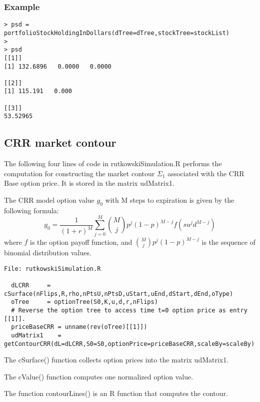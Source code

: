 \documentclass[10pt]{article}
\begin{document}
\subsubsection*{Example}

\begin{verbatim}
> psd = portfolioStockHoldingInDollars(dTree=dTree,stockTree=stockList)
>
> psd
[[1]]
[1] 132.6896   0.0000   0.0000

[[2]]
[1] 115.191   0.000

[[3]]
53.52965

\end{verbatim}


\subsection*{CRR market contour}

The following four lines of code in rutkowskiSimulation.R performs the
computation for constructing the market contour $\Sigma_1$ associated with the
CRR Base option price. It is stored in the matrix udMatrix1.

The CRR model option value $g_0$  with M steps to expiration is given by the following formula:
\[
g_0 = \frac{1}{(1+r)^M} \sum_{j=0}^M \binom{M}{j} p^j (1-p)^{M-j} f(s u^j d^{M-j})
\]
where $f$ is the option payoff function, and $\binom{M}{j} p^j (1-p)^{M-j}$ is the
sequence of binomial distribution values.

\begin{verbatim}
File: rutkowskiSimulation.R

  dLCRR     = cSurface(nFlips,R,rho,nPtsU,nPtsD,uStart,uEnd,dStart,dEnd,oType)
  oTree     = optionTree(S0,K,u,d,r,nFlips)
  # Reverse the option tree to access time t=0 option price as entry [[1]].
  priceBaseCRR = unname(rev(oTree)[[1]])
  udMatrix1    = getContourCRR(dL=dLCRR,S0=S0,optionPrice=priceBaseCRR,scaleBy=scaleBy)
\end{verbatim}

The cSurface() function collects option prices into the matrix udMatrix1.

The cValue() function computes one normalized option value.

The function contourLines() is an R function that computes the contour.
\end{document}
